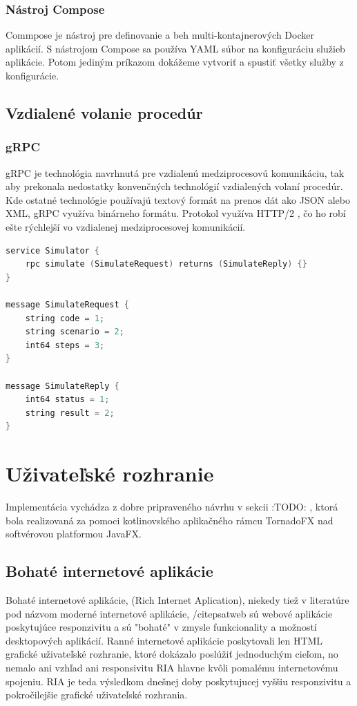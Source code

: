 \subsubsection{Nástroj Compose}

Commpose je nástroj pre definovanie a beh multi-kontajnerových Docker aplikácií. S nástrojom Compose sa používa YAML súbor na konfiguráciu služieb aplikácie. Potom jediným príkazom dokážeme vytvoriť a spustiť všetky služby z konfigurácie. \cite{docker_docs}

\subsection{Vzdialené volanie procedúr}

\subsubsection{gRPC}
gRPC je technológia navrhnutá pre vzdialenú medziprocesovú komunikáciu, tak aby prekonala nedostatky konvenčných technológií vzdialených volaní procedúr. Kde ostatné technológie používajú textový formát na prenos dát ako JSON alebo XML, gRPC využíva binárneho formátu. Protokol využíva HTTP/2 \cite{kuruppu2019grpc}, čo ho robí ešte rýchlejší vo vzdialenej medziprocesovej komunikácií.

\begin{lstlisting}[language=C++]
service Simulator {
	rpc simulate (SimulateRequest) returns (SimulateReply) {}
}

message SimulateRequest {
	string code = 1;
	string scenario = 2;
	int64 steps = 3;
}

message SimulateReply {
	int64 status = 1;
	string result = 2;
}
\end{lstlisting}

\section{Uživateľské rozhranie}

Implementácia vychádza z dobre pripraveného návrhu v sekcii :TODO: , ktorá bola realizovaná za pomoci kotlinovského aplikačného rámcu TornadoFX nad softvérovou platformou JavaFX.

\subsection{Bohaté internetové aplikácie}

Bohaté internetové aplikácie, (Rich Internet Aplication), niekedy tiež v literatúre pod názvom moderné internetové aplikácie, /cite{psatweb} sú webové aplikácie poskytujúce responzivitu a sú "bohaté" v zmysle funkcionality a možností desktopových aplikácií. Ranné internetové aplikácie poskytovali len HTML grafické uživateľské rozhranie, ktoré dokázalo poslúžiť jednoduchým cieľom, no nemalo ani vzhľad ani responsivitu RIA hlavne kvôli pomalému internetovému spojeniu. RIA je teda výsledkom dnešnej doby poskytujucej vyššiu responzivitu a pokročilejšie grafické uživateľské rozhrania.
\cite{deitel2008ajax}

